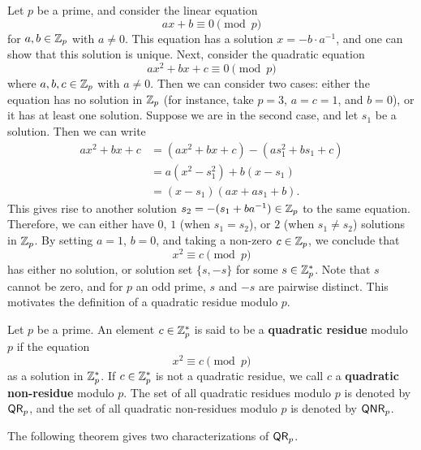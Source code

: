 Let $p$ be a prime, and consider the linear equation 
\[ ax + b \equiv 0 \pmod p \]
for $a, b \in \mathbb{Z}_p$ with $a \neq 0$. This equation has a solution $x = -b \cdot a^{-1}$, and one can 
show that this solution is unique. Next, consider the quadratic equation 
\[ ax^2 + bx + c \equiv 0 \pmod p \]
where $a, b, c \in \mathbb{Z}_p$ with $a \neq 0$. Then we can consider two cases: either the equation 
has no solution in $\mathbb{Z}_p$ (for instance, take $p = 3$, $a = c = 1$, and $b = 0$), or 
it has at least one solution. Suppose we are in the second case, and let $s_1$ be a solution. Then 
we can write 
\begin{align*}
    ax^2 + bx + c &= (ax^2 + bx + c) - (as_1^2 + bs_1 + c) \\
    &= a(x^2 - s_1^2) + b(x - s_1) \\
    &= (x - s_1)(ax + as_1 + b). 
\end{align*}
This gives rise to another solution $s_2 = -(s_1 + ba^{-1}) \in \mathbb{Z}_p$ to the same equation. 
Therefore, we can either have $0$, $1$ (when $s_1 = s_2$), or $2$ (when $s_1 \neq s_2$) solutions in 
$\mathbb{Z}_p$. By setting $a = 1$, $b = 0$, and taking a non-zero $c \in \mathbb{Z}_p$, we conclude that 
\[ x^2 \equiv c \pmod p \]
has either no solution, or solution set $\{s, -s\}$ for some $s \in \mathbb{Z}_p^*$. Note that $s$ cannot 
be zero, and for $p$ an odd prime, $s$ and $-s$ are pairwise distinct. This motivates the 
definition of a quadratic residue modulo $p$. 

\begin{defn}
Let $p$ be a prime. An element $c \in \mathbb{Z}_p^*$ is said to be a {\bf quadratic residue} modulo $p$ if 
the equation 
\[ x^2 \equiv c \pmod p \]
as a solution in $\mathbb{Z}_p^*$. If $c \in \mathbb{Z}_p^*$ is not a quadratic residue, we call $c$ a 
{\bf quadratic non-residue} modulo $p$. The set of all quadratic residues modulo $p$ is denoted by 
${\sf QR}_p$, and the set of all quadratic non-residues modulo $p$ is denoted by ${\sf QNR}_p$. 
\end{defn}

The following theorem gives two characterizations of ${\sf QR}_p$. 

